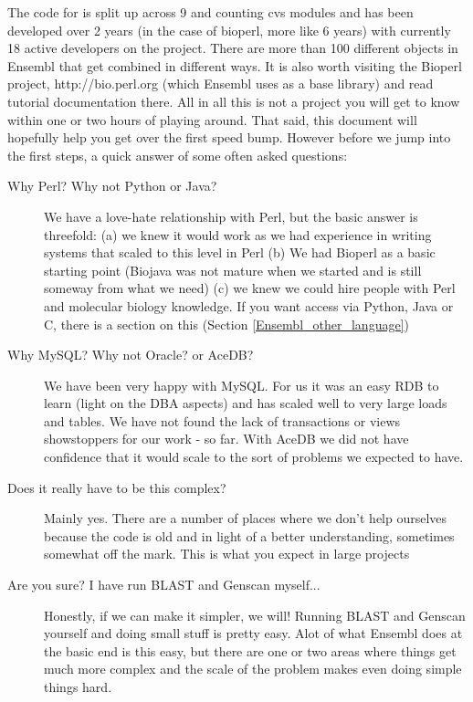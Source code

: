 \documentclass[11pt,a4paper]{article}
\begin{document}
The code for is split up across 9 and counting cvs modules and has
been developed over 2 years (in the case of bioperl, more like 6
years) with currently 18 active developers on the project. There are
more than 100 different objects in Ensembl that get combined in
different ways.  It is also worth visiting the Bioperl project,
http://bio.perl.org (which Ensembl uses as a base library) and read
tutorial documentation there. All in all this is not a project you
will get to know within one or two hours of playing around. That said,
this document will hopefully help you get over the first speed
bump. However before we jump into the first steps, a quick answer of
some often asked questions:

\begin{description}

\item[Why Perl? Why not Python or Java?] We have a love-hate
relationship with Perl, but the basic answer is threefold: (a) we knew
it would work as we had experience in writing systems that scaled to
this level in Perl (b) We had Bioperl as a basic starting point
(Biojava was not mature when we started and is still someway from what
we need) (c) we knew we could hire people with Perl and molecular
biology knowledge. If you want access via Python, Java or C, there is
a section on this (Section \ref{Ensembl_other_language})

\item[Why MySQL? Why not Oracle? or AceDB?] We have been very happy
with MySQL.  For us it was an easy RDB to learn (light on the DBA
aspects) and has scaled well to very large loads and tables. We have
not found the lack of transactions or views showstoppers for our work
- so far. With AceDB we did not have confidence that it would scale to
the sort of problems we expected to have.

\item[Does it really have to be this complex?] Mainly yes. There are a
number of places where we don't help ourselves because the code is old
and in light of a better understanding, sometimes somewhat off the
mark. This is what you expect in large projects

\item[Are you sure? I have run BLAST and Genscan myself...] Honestly,
if we can make it simpler, we will! Running BLAST and Genscan yourself
and doing small stuff is pretty easy. Alot of what Ensembl does at the
basic end is this easy, but there are one or two areas where things
get much more complex and the scale of the problem makes even doing
simple things hard.

\end{description}
\end{document}
